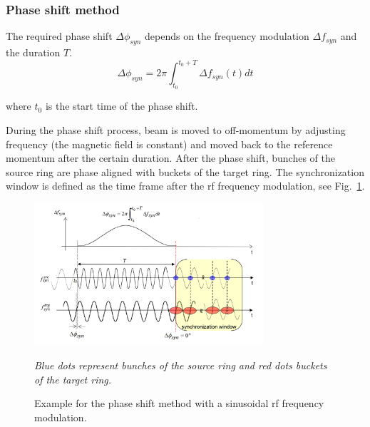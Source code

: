 \subsubsection{Phase shift method}
The required phase shift $\Delta \phi_\mathit{syn}$ depends on the frequency modulation $\Delta f_\mathit{syn}$ and the duration $T$. 
\begin{equation}
\Delta \phi_\mathit{syn}= 2\pi \int_{t_0}^{t_0+T} \Delta f_\mathit{syn}(t)dt \label{phase1}
\end{equation}

where $t_0$ is the start time of the phase shift.

During the phase shift process, beam is moved to off-momentum by adjusting frequency (the magnetic field is constant) and moved back to the reference momentum after the certain duration. After the phase shift, bunches of the source ring are phase aligned with buckets of the target ring. The synchronization window is defined as the time frame after the rf frequency modulation, see Fig.~\ref{phase_shift}.
\begin{figure}[!htb]
   \centering   
   \includegraphics*[width=85mm]{phase_shift.png}
   \caption{Example for the phase shift method with a sinusoidal rf frequency modulation.}{\textsl{\small{Blue dots represent bunches of the source ring and red dots buckets of the target ring.}}}
   \label{phase_shift}
\end{figure} 

